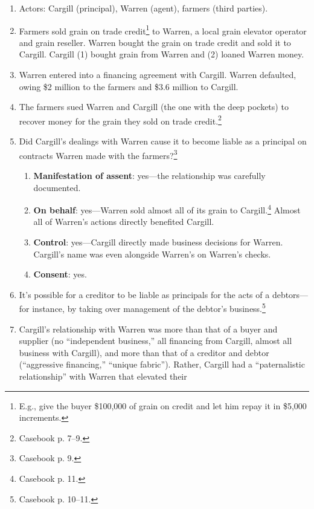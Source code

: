 \begin{enumerate}
    \item Actors: Cargill (principal), Warren (agent), farmers (third 
    parties).
    \item Farmers sold grain on trade credit\footnote{E.g., give the buyer 
    \$100,000 of grain on credit and let him repay it in \$5,000 increments.} 
    to Warren, a local grain elevator operator and grain reseller. Warren 
    bought the grain on trade credit and sold it to Cargill. Cargill (1) bought 
    grain from Warren and (2) loaned Warren money.
    \item Warren entered into a financing agreement with Cargill.
    Warren defaulted, owing \$2 million to the farmers and \$3.6 million to 
    Cargill.
    \item The farmers sued Warren and Cargill (the one with the deep pockets) 
    to recover money for the grain they sold on trade 
    credit.\footnote{Casebook p. 7--9.}
    \item Did Cargill's dealings with Warren cause it to become liable as a 
    principal on contracts Warren made with the farmers?\footnote{Casebook p. 
    9.}
    \begin{enumerate}
        \item \textbf{Manifestation of assent}: yes---the relationship was 
        carefully documented.
        \item \textbf{On behalf}: yes---Warren sold almost all of its grain to 
        Cargill.\footnote{Casebook p. 11.} Almost all of Warren's actions 
        directly benefited Cargill.
        \item \textbf{Control}: yes---Cargill directly made business decisions 
        for Warren. Cargill's name was even alongside Warren's on Warren's 
        checks.
        \item \textbf{Consent}: yes.
    \end{enumerate}
    \item It's possible for a creditor to be liable as principals for the acts 
    of a debtors---for instance, by taking over management of the debtor's 
    business.\footnote{Casebook p. 10--11.}
    \item Cargill's relationship with Warren was more than that of a buyer and 
    supplier (no ``independent business,'' all financing from Cargill, almost 
    all business with Cargill), and more than that of a creditor and debtor 
    (``aggressive financing,'' ``unique fabric''). Rather, Cargill had a 
    ``paternalistic relationship'' with Warren that elevated their 

\end{enumerate}
